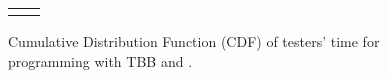 \begin{figure}
\centering
{
  \setlength{\tabcolsep}{0pt}
\begin{tabular}{cc}
\subfigure[\bh{MX}]{
  \scalebox{0.9}{
  \begin{tikzpicture}
  
  \end{tikzpicture}}
} &
\subfigure[\bh{TR}]{
  \scalebox{0.9}{
  \begin{tikzpicture}
  
  \end{tikzpicture}}
} \\
\end{tabular}
}
\caption{Cumulative Distribution Function (CDF) of testers' time for programming with TBB and {\name}.}
\label{fig:program}
\end{figure}
